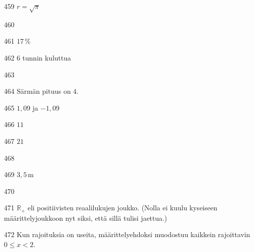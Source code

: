 \begin{Vastaus}{459}
	$r=\sqrt{\pi}$
	
\end{Vastaus}
\begin{Vastaus}{460}
	
\end{Vastaus}
\begin{Vastaus}{461}
		 $17\,\%$
		
\end{Vastaus}
\begin{Vastaus}{462}
	$6$ tunnin kuluttua
	
\end{Vastaus}
\begin{Vastaus}{463}
\end{Vastaus}
\begin{Vastaus}{464}
Särmän pituus on $4$.
\end{Vastaus}
\begin{Vastaus}{465}
	$1,09$ ja $-1,09$
	
\end{Vastaus}
\begin{Vastaus}{466}
	$11$
	
\end{Vastaus}
\begin{Vastaus}{467}
	$21$
	
\end{Vastaus}
\begin{Vastaus}{468}
	
\end{Vastaus}
\begin{Vastaus}{469}
	$3,5$\,m
	
\end{Vastaus}
\begin{Vastaus}{470}
	
\end{Vastaus}
\begin{Vastaus}{471}
	$\mathbb{R}_+$ eli positiivisten reaalilukujen joukko. (Nolla ei kuulu kyseiseen määrittelyjoukkoon nyt siksi, että sillä tulisi jaettua.)
	
\end{Vastaus}
\begin{Vastaus}{472}
	Kun rajoituksia on useita, määrittelyehdoksi muodostuu kaikkein rajoittavin $0\leq x<2$.
	
\end{Vastaus}

